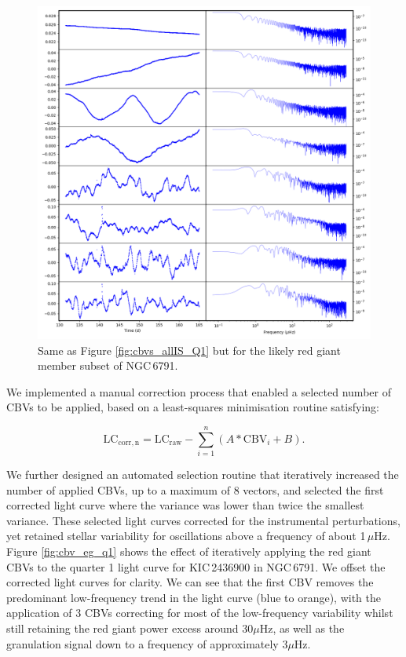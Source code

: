 \begin{figure}
    \centering
    \includegraphics[width=\linewidth]{Chapter5/cbv_6791_rgs_q01.png}
    \caption[Custom co-trending basis vectors with Fourier transforms (II) Red Giant subset]{Same as Figure \ref{fig:cbvs_allIS_Q1} but for the likely red giant member subset of NGC\,6791.}
    \label{fig:cbvs_rgsubset_Q1}
\end{figure}

We implemented a manual correction process that enabled a selected number of CBVs to be applied, based on a least-squares minimisation routine satisfying:

\begin{equation}
    \mathrm{LC}_{\mathrm{corr,n}} = \mathrm{LC}_\mathrm{raw} - \sum_{i=1}^{n} \left(A*\mathrm{CBV}_i + B\right) .
    \label{eqtn:mini}
\end{equation}

\noindent We further designed an automated selection routine that iteratively increased the number of applied CBVs, up to a maximum of 8 vectors, and selected the first corrected light curve where the variance was lower than twice the smallest variance. These selected light curves corrected for the instrumental perturbations, yet retained stellar variability for oscillations above a frequency of about 1\,$\mu$Hz. Figure \ref{fig:cbv_eg_q1} shows the effect of iteratively applying the red giant CBVs to the quarter 1 light curve for KIC\,2436900 in NGC\,6791. We offset the corrected light curves for clarity. We can see that the first CBV removes the predominant low-frequency trend in the light curve (blue to orange), with the application of 3 CBVs correcting for most of the low-frequency variability whilst still retaining the red giant power excess around 30$\mu$Hz, as well as the granulation signal down to a frequency of approximately 3$\mu$Hz. 

